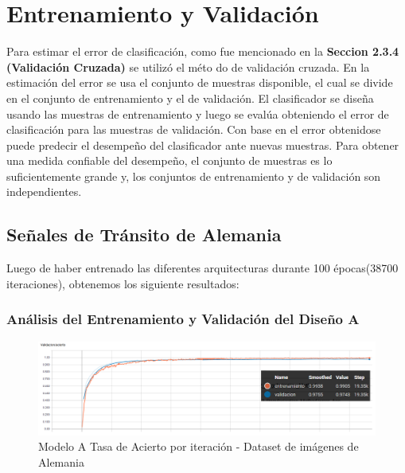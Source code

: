 \section{Entrenamiento y Validación }

	Para estimar el error de clasificación, como fue mencionado en la \textbf{Seccion 2.3.4 (Validación Cruzada)} se utilizó el méto do de validación cruzada. En la estimación del error se usa el conjunto de muestras disponible, el cual se divide en el conjunto de entrenamiento y el de validación. El clasificador se diseña usando las muestras de entrenamiento y luego se evalúa obteniendo el error de clasificación para las muestras de validación. Con base en el error obtenidose puede predecir el desempeño del clasificador ante nuevas muestras. Para obtener una medida confiable del desempeño, el conjunto de muestras es lo suficientemente grande y, los conjuntos de entrenamiento y de validación son independientes.

	\subsection{Señales de Tránsito de Alemania}

		Luego de haber entrenado las diferentes arquitecturas durante 100 épocas(38700 iteraciones), obtenemos los siguiente resultados:
	 	\subsubsection{Análisis del Entrenamiento y Validación del Diseño A}  
			\begin{figure}[H]
				\begin{center}
				\includegraphics[width=1\textwidth]{images/desarrollo/trainResults/model0Acierto} 
				\end{center}
				\begin{center}
				\caption{\small{Modelo A Tasa de Acierto por iteración - Dataset de imágenes de Alemania  }}
				\vspace{-1em}
				{\small{\fontsize{10}{16.8}\selectfont {Fuente propia}}}
				\end{center}
				\vspace{-1.5em}
			\end{figure}

